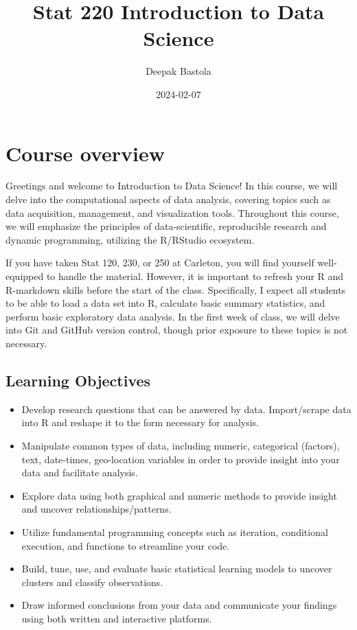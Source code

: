 \documentclass[
]{book}
\title{Stat 220 Introduction to Data Science}
\author{Deepak Bastola}
\date{2024-02-07}
\providecommand{\tightlist}{%
  \setlength{\itemsep}{0pt}\setlength{\parskip}{0pt}}
\begin{document}
\maketitle

{
\setcounter{tocdepth}{1}
\tableofcontents
}
\hypertarget{course-overview}{%
\chapter*{Course overview}\label{course-overview}}

Greetings and welcome to Introduction to Data Science! In this course, we will delve into the computational aspects of data analysis, covering topics such as data acquisition, management, and visualization tools. Throughout this course, we will emphasize the principles of data-scientific, reproducible research and dynamic programming, utilizing the R/RStudio ecosystem.

If you have taken Stat 120, 230, or 250 at Carleton, you will find yourself well-equipped to handle the material. However, it is important to refresh your R and R-markdown skills before the start of the class. Specifically, I expect all students to be able to load a data set into R, calculate basic summary statistics, and perform basic exploratory data analysis. In the first week of class, we will delve into Git and GitHub version control, though prior exposure to these topics is not necessary.

\hypertarget{learning-objectives}{%
\section{Learning Objectives}\label{learning-objectives}}

\begin{itemize}
\tightlist
\item
  Develop research questions that can be answered by data. Import/scrape data into R and reshape it to the form necessary for analysis.
\item
  Manipulate common types of data, including numeric, categorical (factors), text, date-times, geo-location variables in order to provide insight into your data and facilitate analysis.
\item
  Explore data using both graphical and numeric methods to provide insight and uncover relationships/patterns.
\item
  Utilize fundamental programming concepts such as iteration, conditional execution, and functions to streamline your code.
\item
  Build, tune, use, and evaluate basic statistical learning models to uncover clusters and classify observations.
\item
  Draw informed conclusions from your data and communicate your findings using both written and interactive platforms.
\end{itemize}
\end{document}
